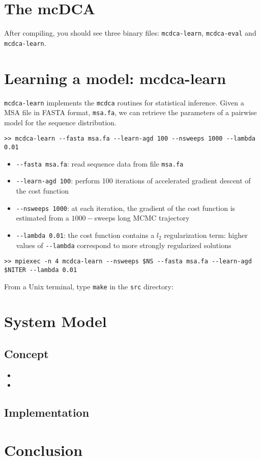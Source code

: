 \documentclass[a4paper,onecolumn]{article}
\begin{document}
\section{The mcDCA }
\label{sec:executables}
After compiling, you should see three binary files: \verb|mcdca-learn|, \verb|mcdca-eval| and \verb|mcdca-learn|.

\section{Learning a model: mcdca-learn}
\verb|mcdca-learn| implements the \verb|mcdca| routines for statistical inference.
Given a MSA file in FASTA format, \verb|msa.fa|, we can retrieve the parameters of a pairwise model for the sequence distribution. 
\begin{verbatim}
>> mcdca-learn --fasta msa.fa --learn-agd 100 --nsweeps 1000 --lambda 0.01
\end{verbatim}
\begin{itemize}
\item \verb|--fasta msa.fa|: read sequence data from file \verb|msa.fa|
\item \verb|--learn-agd 100|: perform 100 iterations of accelerated gradient descent of the cost function
\item \verb|--nsweeps 1000|: at each iteration, the gradient of the cost function is estimated from a $1000-$sweeps long MCMC trajectory
\item \verb|--lambda 0.01|: the cost function contains a $l_2$ regularization term: higher values of \verb|--lambda| correspond to more strongly regularized solutions
\end{itemize}
\begin{verbatim}
>> mpiexec -n 4 mcdca-learn --nsweeps $NS --fasta msa.fa --learn-agd $NITER --lambda 0.01
\end{verbatim}
From a Unix terminal, type \verb|make| in the \verb|src| directory:

\section{System Model}
\label{sec:system-model}

\subsection{Concept}
\lipsum[1]\cite{asimov1951foundation}

\begin{itemize}
	\item \lipsum[53]
	\item \lipsum[11]
\end{itemize}

\lipsum[43]

\subsection{Implementation}
\lipsum[2]

\section{Conclusion}
\label{sec:conclusion}

\lipsum[9-10]


\end{document}
